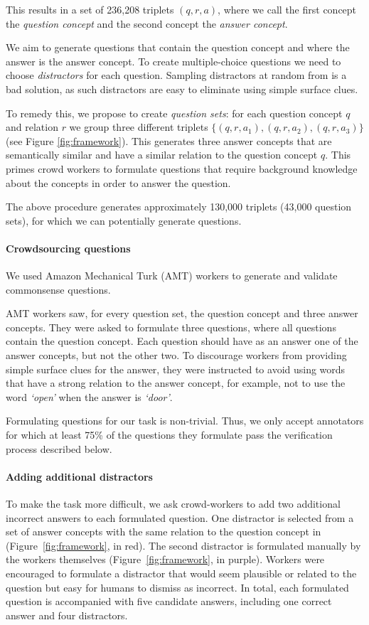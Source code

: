This results in a set of 236,208 triplets $(q, r, a)$, where we call the first concept the \emph{question concept} and the second concept the \emph{answer concept}.

We aim to generate questions that contain the question concept and where the answer is the answer concept. To create multiple-choice questions we need to choose \emph{distractors} for each question. Sampling distractors at random from \conceptnet{} is a bad solution, as such distractors are easy to eliminate using simple surface clues. 

To remedy this, we propose to create \emph{question sets}: for each question concept $q$ and relation $r$ we group three different triplets $\{(q, r, a_1), (q, r, a_2), (q, r, a_3)\}$ (see Figure \ref{fig:framework}). This generates three answer concepts that are semantically similar and have a similar relation to the question concept $q$. This primes crowd workers to formulate questions that require background knowledge about the concepts in order to answer the question.

The above procedure generates approximately 130,000 triplets (43,000 question sets), for which we can potentially generate questions.

\paragraph{Crowdsourcing questions} We used Amazon Mechanical Turk (AMT) workers to generate and validate commonsense questions.

AMT workers saw, for every question set, the question concept and three answer concepts. They were asked to formulate three questions, where all questions contain the question concept. Each question should have as an answer one of the answer concepts, but not the other two. To discourage workers from providing simple surface clues for the answer, they were instructed to avoid using words that have a strong relation to the answer concept, for example, not to use the word \emph{`open'} when the answer is \emph{`door'}. 

Formulating questions for our task is non-trivial. Thus, we only accept annotators for which at least 75\% of the questions they formulate pass the verification process described below. 

\paragraph{Adding additional distractors} To make the task more difficult, we ask crowd-workers to add two additional incorrect answers to each formulated question. One distractor is selected from a set of answer concepts with the same relation to the question concept in \conceptnet{} (Figure~\ref{fig:framework}, in red). The second distractor is formulated manually by the workers themselves (Figure~\ref{fig:framework}, in purple). Workers were encouraged to formulate a distractor that would seem plausible or related to the question but easy for humans to dismiss as incorrect. In total, each formulated question is accompanied with five candidate answers, including one correct answer and four distractors.

